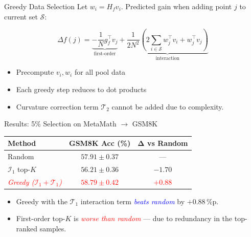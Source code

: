 \documentclass[aspectratio=169]{beamer}
\renewcommand{\emph}[1]{\textit{\textcolor{blue}{#1}}}
\newcommand{\remph}[1]{\textit{\textcolor{red}{#1}}}
\begin{document}
\begin{frame}{Greedy Data Selection}
    Let $w_i = H_f v_i$. Predicted gain when adding point $j$ to current set $\mathcal{S}$:

    \begin{equation}
        \Delta f(j) = \underbrace{-\frac{1}{N} g_f^\top v_j}_{\text{first-order}} + \underbrace{\frac{1}{2N^2}\left(2\sum_{i \in \mathcal{S}} w_j^\top v_i + w_j^\top v_j\right)}_{\text{interaction}}
    \end{equation}

    \vspace{0.5cm}
    \begin{itemize}
        \item Precompute $v_i, w_i$ for all pool data
        \item Each greedy step reduces to dot products
        \item Curvature correction term $\mathcal{T}_2$ cannot be added due to complexity.
    \end{itemize}
\end{frame}

\begin{frame}{Results: 5\% Selection on MetaMath $\to$ GSM8K}

    \vspace{0.4cm}
    \begin{center}
    \small
    \begin{tabular}{lcc}
        \toprule
        \textbf{Method} & \textbf{GSM8K Acc (\%)} & $\bm{\Delta}$ \textbf{vs Random} \\
        \midrule
        Random                                     & $57.91 \pm 0.37$ & ---     \\
        $\mathcal{I}_1$ top-$K$                    & $56.21 \pm 0.36$ & $-1.70$ \\
        \remph{Greedy ($\mathcal{I}_1 + \mathcal{T}_1$)} & \remph{$\bm{58.79 \pm 0.42}$} & \remph{$\bm{+0.88}$} \\
        \bottomrule
    \end{tabular}
    \end{center}

    \vspace{0.5cm}
    \pause
    \begin{itemize}\setlength\itemsep{0.3em}
        \item Greedy with the $\mathcal{T}_1$ interaction term \emph{beats random} by $+0.88$\,\%p.
        \item First-order top-$K$ is \remph{worse than random} --- due to redundancy in the top-ranked samples.
    \end{itemize}
\end{frame}
\end{document}
